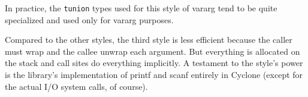 In practice, the \texttt{tunion} types used for this style of vararg
tend to be quite specialized and used only for vararg purposes.

Compared to the other styles, the third style is less efficient
because the caller must wrap and the callee unwrap each argument.  But
everything is allocated on the stack and call sites do everything
implicitly.  A testament to the style's power is the library's
implementation of printf and scanf entirely in Cyclone (except for the
actual I/O system calls, of course).

